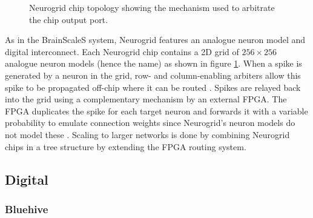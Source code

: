 				\begin{figure}
					\center
					
					\caption[Neurogrid chip topology.]{Neurogrid chip topology showing the
					mechanism used to arbitrate the chip output port.}
					\label{fig:neurogrid-chip}
				\end{figure}
				
				
				As in the BrainScaleS system, Neurogrid features an analogue neuron
				model and digital interconnect. Each Neurogrid chip contains a 2D grid
				of $256\times256$ analogue neuron models (hence the name) as shown in
				figure \ref{fig:neurogrid-chip}. When a spike is generated by a neuron
				in the grid, row- and column-enabling arbiters allow this spike to be
				propagated off-chip where it can be routed \cite{boahen04}. Spikes are
				relayed back into the grid using a complementary mechanism
				\cite{boahen04receiver} by an external FPGA. The FPGA duplicates the
				spike for each target neuron and forwards it with a variable probability
				to emulate connection weights since Neurogrid's neuron models do not
				model these \cite{choudhary12}. Scaling to larger networks is done by
				combining Neurogrid chips in a tree structure by extending the FPGA
				routing system.
				
				
			
		\subsection{Digital}
			
			
			\subsubsection{Bluehive}
				
